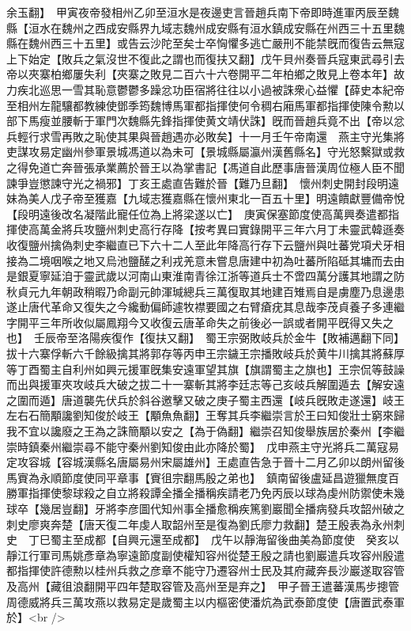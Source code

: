 余玉翻】　甲寅夜帝發相州乙卯至洹水是夜邊吏言晉趙兵南下帝即時進軍丙辰至魏縣【洹水在魏州之西成安縣界九域志魏州成安縣有洹水鎮成安縣在州西三十五里魏縣在魏州西三十五里】或告云沙陀至矣士卒恟懼多逃亡嚴刑不能禁旣而復告云無寇上下始定【敗兵之氣沒世不復此之謂也而復扶又翻】戊午貝州奏晉兵寇東武尋引去帝以夾寨柏鄉屢失利【夾寨之敗見二百六十六卷開平二年柏鄉之敗見上卷本年】故力疾北巡思一雪其恥意鬱鬱多躁忿功臣宿將往往以小過被誅衆心益懼【薛史本紀帝至相州左龍驤都教練使鄧季筠魏博馬軍都指揮使何令稠右廂馬軍都指揮使陳令勲以部下馬瘦並腰斬于軍門次魏縣先鋒指揮使黄文靖伏誅】旣而晉趙兵竟不出【帝以忿兵輕行求雪再敗之恥使其果與晉趙遇亦必敗矣】十一月壬午帝南還　燕主守光集將吏謀攻易定幽州參軍景城馮道以為未可【景城縣屬瀛州漢舊縣名】守光怒繫獄或救之得免道亡奔晉張承業薦於晉王以為掌書記【馮道自此歷事唐晉漢周位極人臣不聞諫爭豈懲諫守光之禍邪】丁亥王處直告難於晉【難乃旦翻】　懷州刺史開封段明遠妹為美人戊子帝至獲嘉【九域志獲嘉縣在懷州東北一百五十里】明遠饋獻豐備帝悅【段明遠後改名凝階此寵任位為上將梁遂以亡】　庚寅保塞節度使高萬興奏遣都指揮使高萬金將兵攻鹽州刺史高行存降【按考異曰實錄開平三年六月丁未靈武韓遜奏收復鹽州擒偽刺史李繼直已下六十二人至此年降高行存下云鹽州與吐蕃党項犬牙相接為二境咽喉之地又烏池鹽醝之利戎羌意未嘗息唐建中初為吐蕃所陷砥其墉而去由是銀夏寧延洎于靈武歲以河南山東淮南青徐江浙等道兵士不啻四萬分護其地謂之防秋貞元九年朝政稍暇乃命副元帥渾瑊總兵三萬復取其地建百雉焉自是虜塵乃息邊患遂止唐代革命又復失之今纔動偏師遽牧襟要國之右臂瘡疣其息哉李茂貞養子多連繼字開平三年所收似屬鳳翔今又收復云唐革命失之前後必一誤或者開平旣得又失之也】　壬辰帝至洛陽疾復作【復扶又翻】　蜀王宗弼敗岐兵於金牛【敗補邁翻下同】拔十六寨俘斬六千餘級擒其將郭存等丙申王宗鐬王宗播敗岐兵於黄牛川擒其將蘇厚等丁酉蜀主自利州如興元援軍旣集安遠軍望其旗【旗謂蜀主之旗也】王宗侃等鼓譟而出與援軍夾攻岐兵大破之拔二十一寨斬其將李廷志等己亥岐兵解圍遁去【解安遠之圍而遁】唐道襲先伏兵於斜谷邀擊又破之庚子蜀主西還【岐兵旣敗走遂還】岐王左右石簡顒讒劉知俊於岐王【顒魚魚翻】王奪其兵李繼崇言於王曰知俊壯士窮來歸我不宜以讒廢之王為之誅簡顒以安之【為于偽翻】繼崇召知俊舉族居於秦州【李繼崇時鎮秦州繼崇尋不能守秦州劉知俊由此亦降於蜀】　戊申燕主守光將兵二萬寇易定攻容城【容城漢縣名唐屬易州宋屬雄州】王處直告急于晉十二月乙卯以朗州留後馬賨為永順節度使同平章事【賨徂宗翻馬殷之弟也】　鎮南留後盧延昌遊獵無度百勝軍指揮使黎球殺之自立將殺譚全播全播稱疾請老乃免丙辰以球為虔州防禦使未幾球卒【幾居豈翻】牙將李彦圖代知州事全播愈稱疾篤劉巖聞全播病發兵攻韶州破之刺史廖爽奔楚【唐天復二年虔人取韶州至是復為劉氏廖力救翻】楚王殷表為永州刺史　丁巳蜀主至成都【自興元還至成都】　戊午以靜海留後曲美為節度使　癸亥以靜江行軍司馬姚彥章為寧遠節度副使權知容州從楚王殷之請也劉巖遣兵攻容州殷遣都指揮使許德勲以桂州兵救之彦章不能守乃遷容州士民及其府藏奔長沙巖遂取容管及高州【藏徂浪翻開平四年楚取容管及高州至是弃之】　甲子晉王遣蕃漢馬步摠管周德威將兵三萬攻燕以救易定是歲蜀主以内樞密使潘炕為武泰節度使【唐置武泰軍於】<br />
